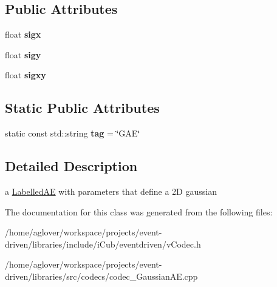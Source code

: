 \subsection*{Public Attributes}
\begin{DoxyCompactItemize}
\item 
float {\bfseries sigx}\hypertarget{classev_1_1GaussianAE_a2d4a7509a323da592be70372f41b09fe}{}\label{classev_1_1GaussianAE_a2d4a7509a323da592be70372f41b09fe}

\item 
float {\bfseries sigy}\hypertarget{classev_1_1GaussianAE_add6bf41b0ffbcbbecea6a63edb81b5b7}{}\label{classev_1_1GaussianAE_add6bf41b0ffbcbbecea6a63edb81b5b7}

\item 
float {\bfseries sigxy}\hypertarget{classev_1_1GaussianAE_a8d04e93f101622ce1f0240f0e02c5c90}{}\label{classev_1_1GaussianAE_a8d04e93f101622ce1f0240f0e02c5c90}

\end{DoxyCompactItemize}
\subsection*{Static Public Attributes}
\begin{DoxyCompactItemize}
\item 
static const std\+::string {\bfseries tag} = \char`\"{}G\+AE\char`\"{}\hypertarget{classev_1_1GaussianAE_a6d0ea5de274ddd380b056d2ba8b019e2}{}\label{classev_1_1GaussianAE_a6d0ea5de274ddd380b056d2ba8b019e2}

\end{DoxyCompactItemize}


\subsection{Detailed Description}
a \hyperlink{classev_1_1LabelledAE}{Labelled\+AE} with parameters that define a 2D gaussian 

The documentation for this class was generated from the following files\+:\begin{DoxyCompactItemize}
\item 
/home/aglover/workspace/projects/event-\/driven/libraries/include/i\+Cub/eventdriven/v\+Codec.\+h\item 
/home/aglover/workspace/projects/event-\/driven/libraries/src/codecs/codec\+\_\+\+Gaussian\+A\+E.\+cpp\end{DoxyCompactItemize}
